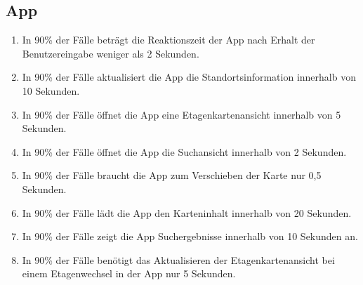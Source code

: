 \subsection*{App}

\begin{samepage}
    \begin{enumerate}[label=\textbf{/NFL\arabic*0/}, align=left]
        \item In 90\% der Fälle beträgt die \Gls{Reaktionszeit} der App nach Erhalt der \Gls{Benutzereingabe} weniger als 2 Sekunden.
        \item In 90\% der Fälle aktualisiert die App die Standortsinformation innerhalb von 10 Sekunden.
        \item In 90\% der Fälle öffnet die App eine \Gls{Etagenkartenansicht} innerhalb von 5 Sekunden.
        \item In 90\% der Fälle öffnet die App die \Gls{Suchansicht} innerhalb von 2 Sekunden.
        \item In 90\% der Fälle braucht die App zum Verschieben der \Gls{Karte} nur 0,5 Sekunden.
        \item In 90\% der Fälle lädt die App den Karteninhalt innerhalb von 20 Sekunden.
        \item In 90\% der Fälle zeigt die App Suchergebnisse innerhalb von 10 Sekunden an.
        \item In 90\% der Fälle benötigt das Aktualisieren der \Gls{Etagenkartenansicht} bei einem \Gls{Etagenwechsel} in der App nur 5 Sekunden.
    \end{enumerate}
\end{samepage}
